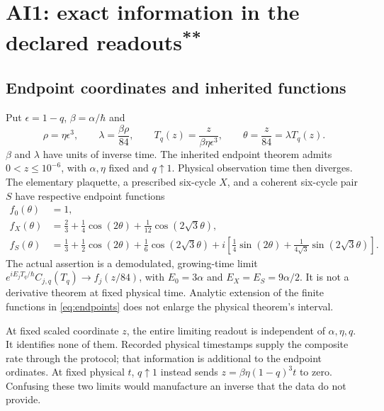 \documentclass[11pt,a4paper]{article}
\newcommand{\workstar}{\textsuperscript{\textbf{**}}}
\begin{document}
\section{AI1: exact information in the declared readouts\workstar}
\subsection{Endpoint coordinates and inherited functions}
Put $\epsilon=1-q$, $\beta=\alpha/\hbar$ and
\begin{equation}
\rho=\eta\epsilon^3,\qquad \lambda=\frac{\beta\rho}{84},\qquad
T_q(z)=\frac{z}{\beta\eta\epsilon^3},\qquad \theta=\frac{z}{84}=\lambda T_q(z).
\label{eq:clock}
\end{equation}
$\beta$ and $\lambda$ have units of inverse time. The inherited endpoint theorem admits $0<z\le10^{-6}$, with $\alpha,\eta$ fixed and $q\uparrow1$. Physical observation time then diverges. The elementary plaquette, a prescribed six-cycle $X$, and a coherent six-cycle pair $S$ have respective endpoint functions
\begin{align}
f_0(\theta)&=1,\nonumber\\
f_X(\theta)&=\frac23+\frac14\cos(2\theta)+\frac1{12}\cos(2\sqrt3\theta),\nonumber\\
f_S(\theta)&=\frac13+\frac12\cos(2\theta)+\frac16\cos(2\sqrt3\theta)
+i\left[\frac14\sin(2\theta)+\frac1{4\sqrt3}\sin(2\sqrt3\theta)\right].
\label{eq:endpoints}
\end{align}
The actual assertion is a demodulated, growing-time limit
$e^{iE_jT_q/\hbar}C_{j,q}(T_q)\to f_j(z/84)$, with
$E_0=3\alpha$ and $E_X=E_S=9\alpha/2$. It is not a derivative theorem at fixed physical time. Analytic extension of the finite functions in \eqref{eq:endpoints} does not enlarge the physical theorem's interval.

At fixed scaled coordinate $z$, the entire limiting readout is independent of $\alpha,\eta,q$. It identifies none of them. Recorded physical timestamps supply the composite rate through the protocol; that information is additional to the endpoint ordinates. At fixed physical $t$, $q\uparrow1$ instead sends $z=\beta\eta(1-q)^3t$ to zero. Confusing these two limits would manufacture an inverse that the data do not provide.
\end{document}
